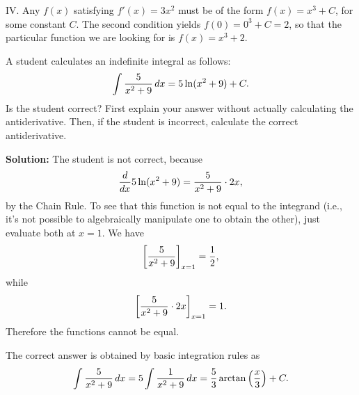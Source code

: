 \documentclass[handout,hints]{ximera}
\begin{document}
IV. Any $f(x)$ satisfying $f'(x) = 3x^2$ must be of the form $f(x) = x^3 + C$, for some constant $C$. The second condition yields $f(0)=0^3 + C = 2$, so that the particular function we are looking for is $f(x) = x^3 + 2$. 

\begin{problem}
A student calculates an indefinite integral as follows:
$$
\int \frac{5}{x^2 + 9} \mathop{}\!d x = 5\ln (x^2 + 9) + C.
$$
Is the student correct? First explain your answer without actually calculating the antiderivative. Then, if the student is incorrect, calculate the correct antiderivative.
\end{problem}

\textbf{Solution:} The student is not correct, because 
$$
\frac{\mathop{}\!d}{\mathop{}\!d x} 5 \ln (x^2 + 9) = \frac{5}{x^2 + 9} \cdot 2x,
$$
by the Chain Rule. To see that this function is not equal to the integrand (i.e., it's not possible to algebraically manipulate one to obtain the other), just evaluate both at $x=1$. We have 
$$
\bigg[ \frac{5}{x^2 + 9} \bigg]_{x=1} = \frac{1}{2},
$$
while 
$$
\bigg[ \frac{5}{x^2 + 9} \cdot 2x \bigg]_{x=1} = 1.
$$
Therefore the functions cannot be equal.

The correct answer is obtained by basic integration rules as
$$
\int \frac{5}{x^2 + 9} \mathop{}\!d x = 5 \int \frac{1}{x^2 + 9} \mathop{}\!d x = \frac{5}{3} \arctan \left(\frac{x}{3}\right) + C.
$$
\end{document}
